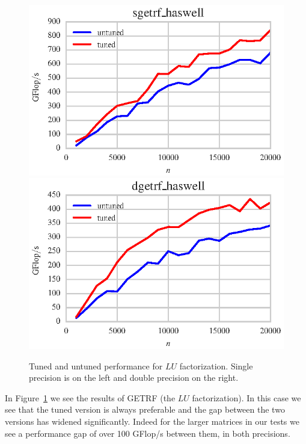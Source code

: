 \documentclass[a4paper,12pt]{article}
\begin{document}
\begin{figure}[ht]
  \centering
  \includegraphics[scale=0.85]{fig/tuned_sgetrf.eps}
  \includegraphics[scale=0.85]{fig/tuned_dgetrf.eps}
  \caption{Tuned and untuned performance for $LU$ factorization. Single
    precision is on the left and double precision on the right.
    \label{fig.tuned_getrf} }
\end{figure}
In Figure~\ref{fig.tuned_getrf} we see the results of
GETRF (the $LU$ factorization).
In this case
we see that the tuned version is always preferable
and the gap between the two versions has widened significantly.
Indeed for the larger matrices in our tests we see a
performance gap of over 100 GFlop/s between them,
in both precisions.
\end{document}
